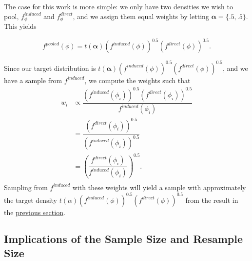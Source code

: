 \documentclass[12pt,twoside]{smiththesis}
\begin{document}
The case for this work is more simple: we only have two densities we wish to pool, \(f_\phi^{induced}\) and \(f_\phi^{direct}\), and we assign them equal weights by letting \(\boldsymbol{\alpha} = \{.5, .5\}\). This yields

\[f^{pooled}(\phi) = t(\boldsymbol \alpha) \left( f^{induced} (\phi) \right)^{0.5} \left( f^{direct} (\phi) \right)^{0.5}.\]

Since our target distribution is \(t(\boldsymbol \alpha) \left( f^{induced} (\phi) \right)^{0.5} \left( f^{direct} (\phi) \right)^{0.5}\), and we have a sample from \(f^{induced}\), we compute the weights such that
\begin{align*} w_i &\propto \dfrac{ \left( f^{induced} (\phi_i) \right)^{0.5} \left( f^{direct} (\phi_i) \right)^{0.5} } {f^{induced}(\phi_i)} \\
&=  \dfrac{ \left( f^{direct} (\phi_i) \right)^{0.5} } {\left( f^{induced} (\phi_i) \right)^{0.5} } \\
&=   \left( \dfrac{  f^{direct} (\phi_i) } { f^{induced} (\phi_i) }  \right)^{0.5}. \\
\end{align*}
Sampling from \(f^{induced}\) with these weights will yield a sample with approximately the target density \(t(\alpha) \left(f^{induced} (\phi) \right)^{0.5} \left( f^{direct} (\phi)\right)^{0.5}\) from the result in the \protect\hyperlink{proof}{previous section}.

\hypertarget{presamp}{%
\subsection{Implications of the Sample Size and Resample Size}\label{presamp}}
\end{document}
